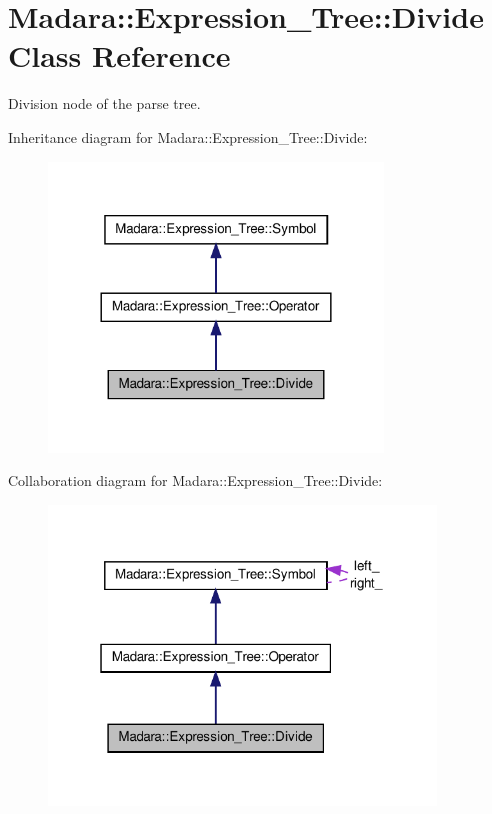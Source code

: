\hypertarget{classMadara_1_1Expression__Tree_1_1Divide}{
\section{Madara::Expression\_\-Tree::Divide Class Reference}
\label{dc/d30/classMadara_1_1Expression__Tree_1_1Divide}
}


Division node of the parse tree.  




Inheritance diagram for Madara::Expression\_\-Tree::Divide:
\nopagebreak
\begin{figure}[H]
\begin{center}
\leavevmode
\includegraphics[width=252pt]{dc/dcb/classMadara_1_1Expression__Tree_1_1Divide__inherit__graph}
\end{center}
\end{figure}


Collaboration diagram for Madara::Expression\_\-Tree::Divide:
\nopagebreak
\begin{figure}[H]
\begin{center}
\leavevmode
\includegraphics[width=292pt]{d9/dde/classMadara_1_1Expression__Tree_1_1Divide__coll__graph}
\end{center}
\end{figure}
